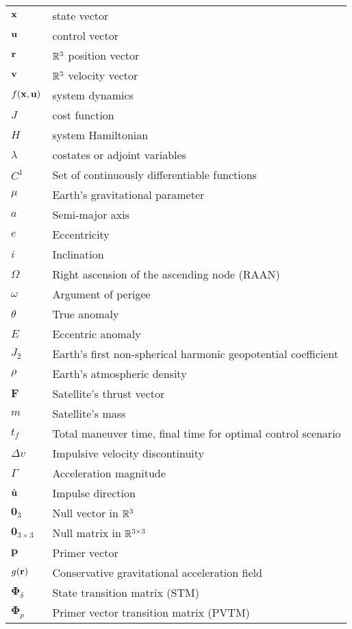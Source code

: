\begin{longtable}{ll}
\(\mathbf{x}\) & state vector \\
\(\mathbf{u}\) & control vector \\
\(\mathbf{r}\) & \(\mathbb{R}^3\) position vector \\
\(\mathbf{v}\) & \(\mathbb{R}^3\) velocity vector \\
\(f(\mathbf{x}, \mathbf{u})\) & system dynamics \\
\(J\) & cost function \\
\(H\) & system Hamiltonian \\
\(\lambda\) & costates or adjoint variables \\
\(C^1\) & Set of continuously differentiable functions \\
\(\mu\) & Earth's gravitational parameter \\
\(a\) & Semi-major axis \\
\(e\) & Eccentricity \\
\(i\) & Inclination \\
\(\Omega \) & Right ascension of the ascending node (RAAN) \\
\(\omega \) & Argument of perigee \\
\(\theta \) & True anomaly \\
\(E\) & Eccentric anomaly \\
\(J_2\) & Earth's first non-spherical harmonic geopotential coefficient \\
\(\rho\) & Earth's atmospheric density \\
\(\mathbf{F}\) & Satellite's thrust vector \\
\(m\) & Satellite's mass \\
\(t_f\) & Total maneuver time, final time for optimal control scenario \\
\(\Delta v\) & Impulsive velocity discontinuity \\
\(\Gamma\) & Acceleration magnitude \\
\(\hat{\mathbf{u}}\) & Impulse direction \\
\(\mathbf{0}_3\) & Null vector in \(\mathbb{R}^3\) \\
\(\mathbf{0}_{3 \times 3}\) & Null matrix in \(\mathbb{R}^{3 \times 3}\) \\
\(\mathbf{p}\) & Primer vector \\
\(g(\mathbf{r})\) & Conservative gravitational acceleration field \\
\(\mathbf{\Phi}_\delta\) & State transition matrix (STM) \\
\(\mathbf{\Phi}_p\) & Primer vector transition matrix (PVTM) \\

\end{longtable}
